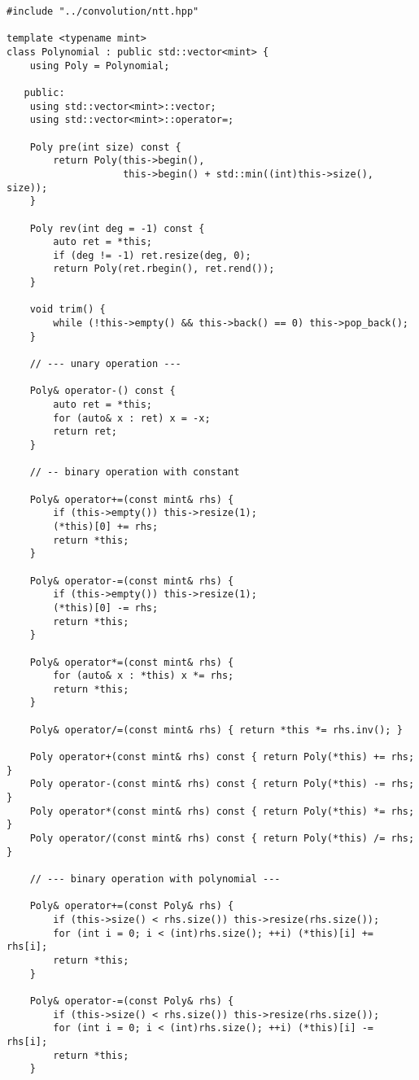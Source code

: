 \begin{lstlisting}
#include "../convolution/ntt.hpp"

template <typename mint>
class Polynomial : public std::vector<mint> {
    using Poly = Polynomial;

   public:
    using std::vector<mint>::vector;
    using std::vector<mint>::operator=;

    Poly pre(int size) const {
        return Poly(this->begin(),
                    this->begin() + std::min((int)this->size(), size));
    }

    Poly rev(int deg = -1) const {
        auto ret = *this;
        if (deg != -1) ret.resize(deg, 0);
        return Poly(ret.rbegin(), ret.rend());
    }

    void trim() {
        while (!this->empty() && this->back() == 0) this->pop_back();
    }

    // --- unary operation ---

    Poly& operator-() const {
        auto ret = *this;
        for (auto& x : ret) x = -x;
        return ret;
    }

    // -- binary operation with constant

    Poly& operator+=(const mint& rhs) {
        if (this->empty()) this->resize(1);
        (*this)[0] += rhs;
        return *this;
    }

    Poly& operator-=(const mint& rhs) {
        if (this->empty()) this->resize(1);
        (*this)[0] -= rhs;
        return *this;
    }

    Poly& operator*=(const mint& rhs) {
        for (auto& x : *this) x *= rhs;
        return *this;
    }

    Poly& operator/=(const mint& rhs) { return *this *= rhs.inv(); }

    Poly operator+(const mint& rhs) const { return Poly(*this) += rhs; }
    Poly operator-(const mint& rhs) const { return Poly(*this) -= rhs; }
    Poly operator*(const mint& rhs) const { return Poly(*this) *= rhs; }
    Poly operator/(const mint& rhs) const { return Poly(*this) /= rhs; }

    // --- binary operation with polynomial ---

    Poly& operator+=(const Poly& rhs) {
        if (this->size() < rhs.size()) this->resize(rhs.size());
        for (int i = 0; i < (int)rhs.size(); ++i) (*this)[i] += rhs[i];
        return *this;
    }

    Poly& operator-=(const Poly& rhs) {
        if (this->size() < rhs.size()) this->resize(rhs.size());
        for (int i = 0; i < (int)rhs.size(); ++i) (*this)[i] -= rhs[i];
        return *this;
    }


\end{lstlisting}
